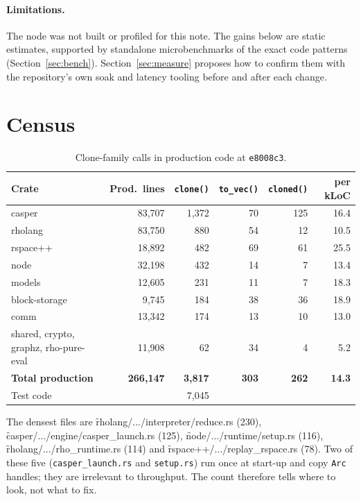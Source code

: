 \documentclass[11pt]{article}
\begin{document}
\paragraph{Limitations.} The node was not built or profiled for this note. The gains below are
static estimates, supported by standalone microbenchmarks of the exact code patterns
(Section~\ref{sec:bench}). Section~\ref{sec:measure} proposes how to confirm them with the
repository's own soak and latency tooling before and after each change.

\section{Census}

\begin{table}[ht]
\centering\small
\begin{tabular}{lrrrrr}
\toprule
Crate & Prod.\ lines & \texttt{clone()} & \texttt{to\_vec()} & \texttt{cloned()} & per kLoC\\
\midrule
casper          & 83{,}707 & 1{,}372 & 70 & 125 & 16.4\\
rholang         & 83{,}750 &   880 & 54 &  12 & 10.5\\
rspace++        & 18{,}892 &   482 & 69 &  61 & 25.5\\
node            & 32{,}198 &   432 & 14 &   7 & 13.4\\
models          & 12{,}605 &   231 & 11 &   7 & 18.3\\
block-storage   &  9{,}745 &   184 & 38 &  36 & 18.9\\
comm            & 13{,}342 &   174 & 13 &  10 & 13.0\\
shared, crypto, graphz, rho-pure-eval & 11{,}908 & 62 & 34 & 4 & 5.2\\
\midrule
\textbf{Total production} & \textbf{266{,}147} & \textbf{3{,}817} & \textbf{303} & \textbf{262} & \textbf{14.3}\\
Test code & & 7{,}045 & & & \\
\bottomrule
\end{tabular}
\caption{Clone-family calls in production code at \texttt{e8008c3}.}
\end{table}

The densest files are \f{rholang/.../interpreter/reduce.rs} (230), \f{casper/.../engine/casper_launch.rs} (125),
\f{node/.../runtime/setup.rs} (116), \f{rholang/.../rho_runtime.rs} (114) and
\f{rspace++/.../replay_rspace.rs} (78). Two of these five (\texttt{casper\_launch.rs} and
\texttt{setup.rs}) run once at start-up and copy \texttt{Arc} handles; they are irrelevant to
throughput. The count therefore tells where to look, not what to fix.
\end{document}
